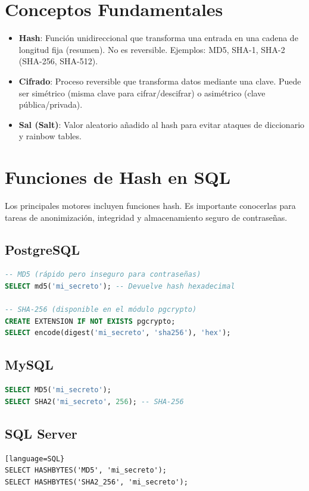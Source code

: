 \documentclass[12pt,a4paper,openany,oneside]{book}
\begin{document}
\section{Conceptos Fundamentales}
\begin{itemize}
    \item \textbf{Hash}: Función unidireccional que transforma una entrada en una cadena de longitud fija (resumen). No es reversible. Ejemplos: MD5, SHA-1, SHA-2 (SHA-256, SHA-512).
    \item \textbf{Cifrado}: Proceso reversible que transforma datos mediante una clave. Puede ser simétrico (misma clave para cifrar/descifrar) o asimétrico (clave pública/privada).
    \item \textbf{Sal (Salt)}: Valor aleatorio añadido al hash para evitar ataques de diccionario y rainbow tables.
\end{itemize}

\section{Funciones de Hash en SQL}
Los principales motores incluyen funciones hash. Es importante conocerlas para tareas de anonimización, integridad y almacenamiento seguro de contraseñas.

\subsection{PostgreSQL}
\begin{lstlisting}[language=SQL]
-- MD5 (rápido pero inseguro para contraseñas)
SELECT md5('mi_secreto'); -- Devuelve hash hexadecimal

-- SHA-256 (disponible en el módulo pgcrypto)
CREATE EXTENSION IF NOT EXISTS pgcrypto;
SELECT encode(digest('mi_secreto', 'sha256'), 'hex');
\end{lstlisting}

\subsection{MySQL}
\begin{lstlisting}[language=SQL]
SELECT MD5('mi_secreto');
SELECT SHA2('mi_secreto', 256); -- SHA-256
\end{lstlisting}

\subsection{SQL Server}
\begin{lstlisting}[language=SQL}
SELECT HASHBYTES('MD5', 'mi_secreto');
SELECT HASHBYTES('SHA2_256', 'mi_secreto');
\end{lstlisting}
\end{document}

